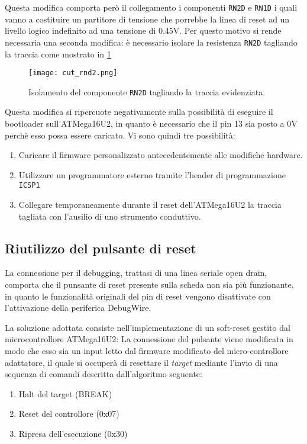 Questa modifica comporta però il collegamento i componenti \texttt{RN2D} e \texttt{RN1D} i quali vanno a costituire un partitore di tensione che porrebbe la linea di reset ad un livello logico indefinito ad una tensione di 0.45V. Per questo motivo si rende necessaria una seconda modifica: è necessario isolare la resistenza \texttt{RN2D} tagliando la traccia come mostrato in \cref{fig:cut-rnd2}

\begin{figure}[b]
    \centering
    \texttt{[image: cut\_rnd2.png]}
    \caption[]{Isolamento del componente \texttt{RN2D} tagliando la traccia evidenziata.}\label{fig:cut-rnd2}
\end{figure}

Questa modifica si ripercuote negativamente sulla possibilità di eseguire il bootloader sull'ATMega16U2, in quanto è necessario che il pin 13 sia posto a 0V perchè esso possa essere caricato. Vi sono quindi tre possibilità:
\begin{enumerate}
    \item Caricare il firmware personalizzato antecedentemente alle modifiche hardware.
    \item Utilizzare un programmatore esterno tramite l'header di programmazione \texttt{ICSP1}
    \item Collegare temporaneamente durante il reset dell'ATMega16U2 la traccia tagliata con l'ausilio di uno strumento conduttivo.
\end{enumerate} 

\subsection{Riutilizzo del pulsante di reset}

La connessione per il debugging, trattasi di una linea seriale open drain, comporta che il punsante di reset presente sulla scheda non sia più funzionante, in quanto le funzionalità originali del pin di reset vengono disattivate con l'attivazione della periferica DebugWire.

La soluzione adottata consiste nell'implementazione di un soft-reset gestito dal microcontrollore ATMega16U2: La connessione del pulsante viene modificata in modo che esso sia un input letto dal firmware modificato del micro-controllore adattatore, il quale si occuperà di resettare il \textit{target} mediante l'invio di una sequenza di comandi descritta dall'algoritmo seguente:
\begin{enumerate}
    \item Halt del target (BREAK)
    \item Reset del controllore (0x07)
    \item Ripresa dell'esecuzione (0x30)
\end{enumerate}

